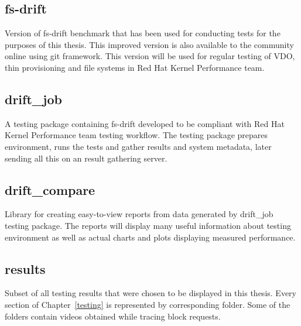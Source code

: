 \documentclass[
  color, %
  table, %
  lof,   %
  lot,   %
]{fithesis3}
\begin{document}
\subsection{fs-drift}
Version of fs-drift benchmark that has been used for conducting tests for the purposes of this thesis. This improved version is also available to the community online using git framework. This version will be used for regular testing of VDO, thin provisioning and file systems in Red Hat Kernel Performance team.

\subsection{drift\_job}
A testing package containing fs-drift developed to be compliant with Red Hat Kernel Performance team testing workflow. The testing package prepares environment, runs the tests and gather results and system metadata, later sending all this on an result gathering server. 

\subsection{drift\_compare}
Library for creating easy-to-view reports from data generated by drift\_job testing package. The reports will display many useful information about testing environment as well as actual charts and plots displaying measured performance.

\subsection{results}
Subset of all testing results that were chosen to be displayed in this thesis. Every section of Chapter~\ref{testing} is represented by corresponding folder. Some of the folders contain videos obtained while tracing block requests.
\end{document}

